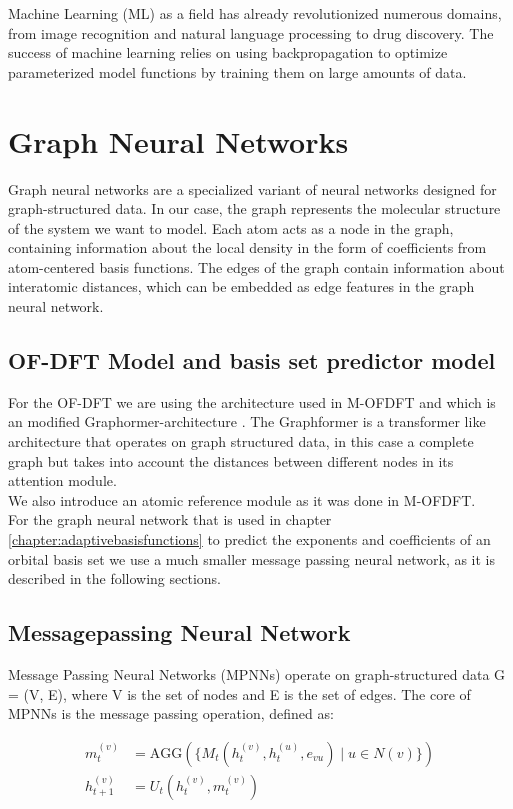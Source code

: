 Machine Learning (ML) as a field has already revolutionized numerous domains, from image recognition and natural language processing to drug discovery. The success of machine learning relies on using backpropagation to optimize parameterized model functions by training them on large amounts of data.

\section{Graph Neural Networks}\label{model}
Graph neural networks are a specialized variant of neural networks designed for graph-structured data. In our case, the graph represents the molecular structure of the system we want to model. Each atom acts as a node in the graph, containing information about the local density in the form of coefficients from atom-centered basis functions. The edges of the graph contain information about interatomic distances, which can be embedded as edge features in the graph neural network.
\subsection{OF-DFT Model and basis set predictor model}
For the OF-DFT we are using the architecture used in M-OFDFT\cite{zhang_m-ofdft_2023} and which is an modified Graphormer-architecture \cite{ying2021transformers}. The Graphformer is a transformer like architecture that operates on graph structured data, in this case a complete graph but takes into account the distances between different nodes in its attention module.\\
We also introduce an atomic reference module as it was done in M-OFDFT.\\
For the graph neural network that is used in chapter
\ref{chapter:adaptivebasisfunctions} to predict the exponents and coefficients of an orbital basis set we use a much smaller message passing neural network, as it is described in the following sections.

\subsection{Messagepassing Neural Network}
Message Passing Neural Networks (MPNNs) operate on graph-structured data G = (V, E), where V is the set of nodes and E is the set of edges. The core of MPNNs is the message passing operation, defined as:

\begin{align}
m_t^{(v)} &= \text{AGG}\left(\{M_t(h_t^{(v)}, h_t^{(u)}, e_{vu}) \mid u \in N(v)\}\right) \\
h_{t+1}^{(v)} &= U_t(h_t^{(v)}, m_t^{(v)})
\end{align} 
    

